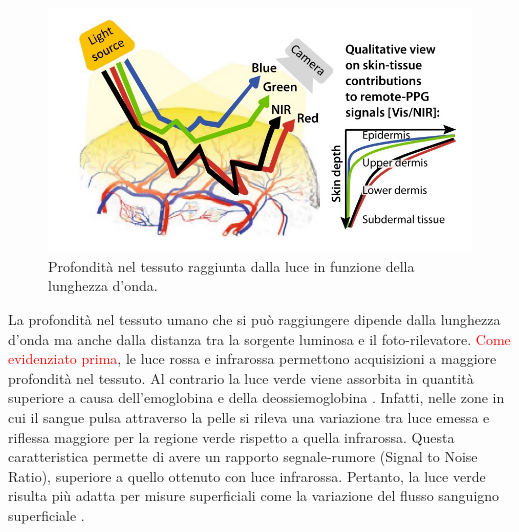 \begin{figure}[h]
	\centering
	\includegraphics[width=0.7\linewidth]{ImageFiles/Fotopletismografia/PenetrazioneLuce}
	\caption{Profondità nel tessuto raggiunta dalla luce in funzione della lunghezza d'onda.}
	\label{fig:PenetrazioneLuce}
\end{figure}

La profondità nel tessuto umano che si può raggiungere dipende dalla lunghezza d'onda ma anche dalla distanza tra la sorgente luminosa e il foto-rilevatore. \textcolor{red}{Come evidenziato prima}, le luce rossa e infrarossa permettono acquisizioni a maggiore profondità nel tessuto. Al contrario la luce verde viene assorbita in quantità superiore\cite{Lee2021} a causa dell'emoglobina e della deossiemoglobina . Infatti, nelle zone in cui il sangue pulsa attraverso la pelle si rileva una variazione tra luce emessa e riflessa maggiore per la regione verde rispetto a quella infrarossa. Questa caratteristica permette di avere un rapporto segnale-rumore (Signal to Noise Ratio), superiore a quello ottenuto con luce infrarossa. Pertanto, la luce verde risulta più adatta per misure superficiali come la variazione del flusso sanguigno superficiale \cite{Youssef2020}.
